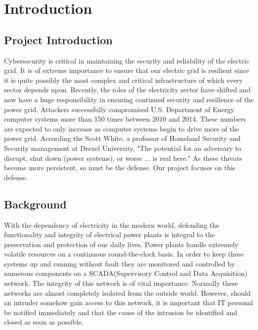 \chapter{Introduction}

\section{Project Introduction}

Cybersecurity is critical in maintaining the security and reliability of the electric grid. It is of extreme importance to ensure that our electric grid is resilient since it is quite possibly the most complex and critical infrastructure of which every sector depends upon. Recently, the roles of the electricity sector have shifted and now have a huge responsibility in ensuring continued security and resilience of the power grid. 
Attackers successfully compromised U.S. Department of Energy computer systems more than 150 times between 2010 and 2014. These numbers are expected to only increase as computer systems begin to drive more of the power grid. According the Scott White, a professor of Homeland Security and Security management at Drexel University, "The potential for an adversary to disrupt, shut down (power systems), or worse ... is real here." As these threats become more persistent, so must be the defense. Our project focuses on this defense. 

\section{Background}
With the dependency of electricity in the modern world, defending the functionality and integrity of electrical power plants is integral to the preservation and protection of our daily lives. Power plants handle extremely volatile resources on a continuous round-the-clock basis. In order to keep these systems up and running without fault they are monitored and controlled by numerous components on a SCADA(Supervisory Control and Data Acquisition) network. The integrity of this network is of vital importance. Normally these networks are almost completely isolated from the outside world. However, should an intruder somehow gain access to this network, it is important that IT personal be notified immediately and that the cause of the intrusion be identified and closed as soon as possible.

